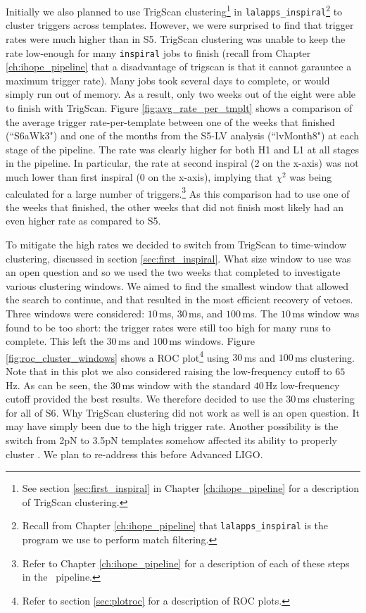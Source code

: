 Initially we also planned to use TrigScan clustering\footnote{See section
\ref{sec:first_inspiral} in Chapter \ref{ch:ihope_pipeline} for a description
of TrigScan clustering.} in \verb|lalapps_inspiral|\footnote{Recall from
Chapter \ref{ch:ihope_pipeline} that \texttt{lalapps\_inspiral} is the program
we use to perform match filtering.} to cluster triggers across templates.
However, we were surprised to find that trigger rates were much higher than in
\ac{S5}. TrigScan clustering was unable to keep the rate low-enough for many
\texttt{inspiral} jobs to finish (recall from Chapter \ref{ch:ihope_pipeline}
that a disadvantage of trigscan is that it cannot garauntee a maximum trigger
rate). Many jobs took several days to complete, or would simply run out of
memory. As a result, only two weeks out of the eight were able to finish with
TrigScan. Figure \ref{fig:avg_rate_per_tmplt} shows a comparison of the average
trigger rate-per-template between one of the weeks that finished (``S6aWk3")
and one of the months from the \ac{S5}-LV analysis (``lvMonth8") at each stage
of the pipeline. The rate was clearly higher for both H1 and L1 at all stages
in the pipeline. In particular, the rate at second inspiral (2 on the x-axis)
was not much lower than first inspiral (0 on the x-axis), implying that
$\chi^2$ was being calculated for a large number of triggers.\footnote{Refer to
Chapter \ref{ch:ihope_pipeline} for a description of each of these steps in the
\ihope~pipeline.} As this comparison had to use one of the weeks that finished,
the other weeks that did not finish most likely had an even higher rate as
compared to \ac{S5}.

To mitigate the high rates we decided to switch from TrigScan to time-window
clustering, discussed in section \ref{sec:first_inspiral}. What size window to
use was an open question and so we used the two weeks that completed to
investigate various clustering windows. We aimed to find the smallest window
that allowed the search to continue, and that resulted in the most efficient
recovery of vetoes. Three windows were considered: $10\,$ms, $30\,$ms, and
$100\,$ms. The $10\,$ms window was found to be too short: the trigger rates
were still too high for many runs to complete. This left the $30\,$ms and
$100\,$ms windows. Figure \ref{fig:roc_cluster_windows} shows a ROC
plot\footnote{Refer to section \ref{sec:plotroc} for a description of ROC
plots.} using $30\,$ms and $100\,$ms clustering. Note that in this plot we also
considered raising the low-frequency cutoff to $65\,$Hz. As can be seen, the
$30\,$ms window with the standard $40\,$Hz low-frequency cutoff provided the
best results. We therefore decided to use the $30\,$ms clustering for all of
\ac{S6}. Why TrigScan clustering did not work as well is an open question. It
may have simply been due to the high trigger rate. Another possibility is the
switch from 2\ac{pN} to 3.5\ac{pN} templates somehow affected its ability to
properly cluster \cite{Pekowsky:thesis}. We plan to re-address this before
Advanced \ac{LIGO}.

